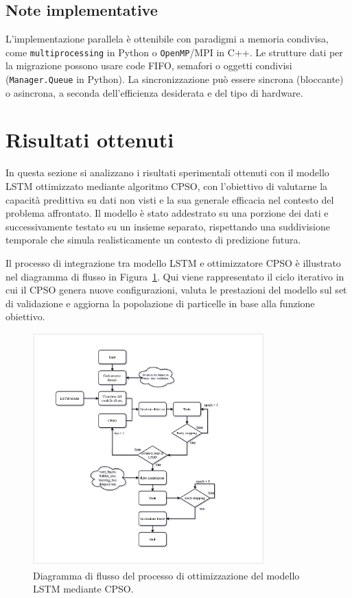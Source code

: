 \documentclass{article}
\begin{document}
\subsection{Note implementative}

L'implementazione parallela è ottenibile con paradigmi a memoria condivisa, come 
\texttt{multiprocessing} in Python o \texttt{OpenMP}/MPI in C++. Le strutture dati per la migrazione 
possono usare code FIFO, semafori o oggetti condivisi (\texttt{Manager.Queue} in Python). 
La sincronizzazione può essere sincrona (bloccante) o asincrona, a seconda dell’efficienza desiderata e 
del tipo di hardware.

\section{Risultati ottenuti}

In questa sezione si analizzano i risultati sperimentali ottenuti con il modello LSTM ottimizzato 
mediante algoritmo CPSO, con l’obiettivo di valutarne la capacità predittiva su dati non visti e la sua 
generale efficacia nel contesto del problema affrontato. Il modello è stato addestrato su una porzione 
dei dati e successivamente testato su un insieme separato, rispettando una suddivisione temporale che 
simula realisticamente un contesto di predizione futura.

Il processo di integrazione tra modello LSTM e ottimizzatore CPSO è illustrato nel diagramma di flusso 
in Figura~\ref{fig:cpso_flowchart}. Qui viene rappresentato il ciclo iterativo in cui il CPSO genera 
nuove configurazioni, valuta le prestazioni del modello sul set di validazione e aggiorna la popolazione 
di particelle in base alla funzione obiettivo.

\begin{figure}[H]
\centering
\includegraphics[width=0.8\textwidth]{img/LSTM-CPSO-MODEL.png}
\caption{Diagramma di flusso del processo di ottimizzazione del modello LSTM mediante CPSO.}
\label{fig:cpso_flowchart}
\end{figure}
\end{document}
